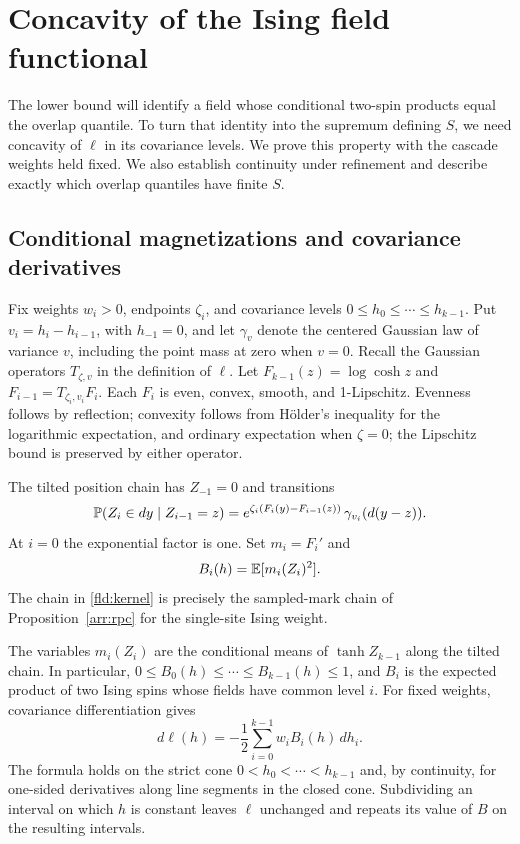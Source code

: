 \section{Concavity of the Ising field functional}\label{sec:field}

The lower bound will identify a field whose conditional two-spin
products equal the overlap quantile. To turn that identity into the
supremum defining $S$, we need concavity of $\ell$ in its covariance
levels. We prove this property with the cascade weights held fixed.
We also establish continuity under refinement and describe exactly
which overlap quantiles have finite $S$.

\subsection{Conditional magnetizations and covariance derivatives}

Fix weights $w_i>0$, endpoints $\zeta_i$, and covariance levels
$0\leq h_0\leq\cdots\leq h_{k-1}$. Put
$v_i=h_i-h_{i-1}$, with $h_{-1}=0$, and let $\gamma_v$ denote the
centered Gaussian law of variance $v$, including the point mass at zero
when $v=0$. Recall the Gaussian operators $T_{\zeta,v}$ in the
definition of $\ell$. Let $F_{k-1}(z)=\log\cosh z$ and
$F_{i-1}=T_{\zeta_i,v_i}F_i$. Each $F_i$ is even, convex, smooth,
and 1-Lipschitz. Evenness follows by reflection; convexity follows from
H\"older's inequality for the logarithmic expectation, and ordinary
expectation when $\zeta=0$; the Lipschitz bound is preserved by either
operator.

The tilted position chain has $Z_{-1}=0$ and transitions
\begin{equation}\label{fld:kernel}
 \mathbb P(Z_i\in dy\mid Z_{i-1}=z)
 =e^{\zeta_i(F_i(y)-F_{i-1}(z))}\,\gamma_{v_i}(d(y-z)).
\end{equation}
At $i=0$ the exponential factor is one. Set $m_i=F_i'$ and
\begin{equation}\label{fld:B}
 B_i(h)=\mathbb E[m_i(Z_i)^2].
\end{equation}
The chain in \eqref{fld:kernel} is precisely the sampled-mark chain
of Proposition~\ref{arr:rpc} for the single-site Ising weight.

\begin{proposition}\label{fld:derivative}
The variables $m_i(Z_i)$ are the conditional means of
$\tanh Z_{k-1}$ along the tilted chain. In particular,
$0\leq B_0(h)\leq\cdots\leq B_{k-1}(h)\leq1$, and $B_i$ is the
expected product of two Ising spins whose fields have common level
$i$. For fixed weights, covariance differentiation gives
\begin{equation}\label{fld:gradient}
 d\ell(h)=-\frac12\sum_{i=0}^{k-1}w_iB_i(h)\,dh_i.
\end{equation}
The formula holds on the strict cone
$0<h_0<\cdots<h_{k-1}$ and, by continuity, for one-sided derivatives
along line segments in the closed cone. Subdividing an interval on
which $h$ is constant leaves $\ell$ unchanged and repeats its value of
$B$ on the resulting intervals.
\end{proposition}


